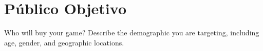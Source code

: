 \chapter{Público Objetivo}
Who will buy your game? Describe the demographic you are targeting, including age, gender, and geographic locations.